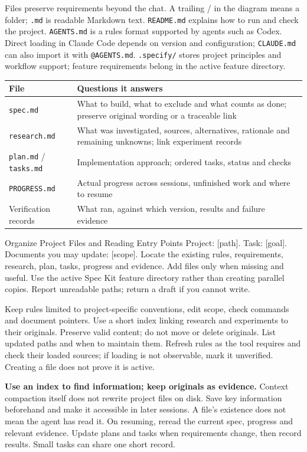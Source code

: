 Files preserve requirements beyond the chat. A trailing / in the diagram means a folder; \texttt{.md} is readable Markdown text. \texttt{README.md} explains how to run and check the project. \texttt{AGENTS.md} is a rules format supported by agents such as Codex. Direct loading in Claude Code depends on version and configuration; \texttt{CLAUDE.md} can also import it with \texttt{@AGENTS.md}. \texttt{.specify/} stores project principles and workflow support; feature requirements belong in the active feature directory.
\begin{tabularx}{\linewidth}{@{}L{38mm}Y@{}}
\toprule File & Questions it answers\\\midrule
\texttt{spec.md} & What to build, what to exclude and what counts as done; preserve original wording or a traceable link\\
\texttt{research.md} & What was investigated, sources, alternatives, rationale and remaining unknowns; link experiment records\\
\texttt{plan.md} / \texttt{tasks.md} & Implementation approach; ordered tasks, status and checks\\
\texttt{PROGRESS.md} & Actual progress across sessions, unfinished work and where to resume\\
Verification records & What ran, against which version, results and failure evidence\\
\bottomrule\end{tabularx}
\begin{prompt}{Organize Project Files and Reading Entry Points}
Project: [path]. Task: [goal]. Documents you may update: [scope]. Locate the existing rules, requirements, research, plan, tasks, progress and evidence. Add files only when missing and useful. Use the active Spec Kit feature directory rather than creating parallel copies. Report unreadable paths; return a draft if you cannot write.\par
Keep rules limited to project-specific conventions, edit scope, check commands and document pointers. Use a short index linking research and experiments to their originals. Preserve valid content; do not move or delete originals. List updated paths and when to maintain them. Refresh rules as the tool requires and check their loaded sources; if loading is not observable, mark it unverified. Creating a file does not prove it is active.
\end{prompt}
\textbf{Use an index to find information; keep originals as evidence.} Context compaction itself does not rewrite project files on disk. Save key information beforehand and make it accessible in later sessions. A file's existence does not mean the agent has read it. On resuming, reread the current spec, progress and relevant evidence. Update plans and tasks when requirements change, then record results. Small tasks can share one short record.
